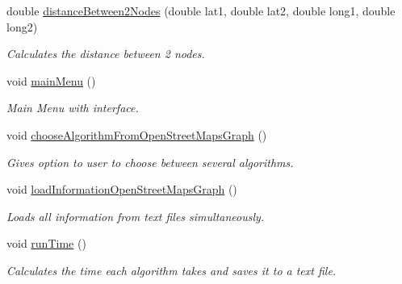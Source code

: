 \begin{DoxyCompactItemize}
\hypertarget{class_supermarket_network_afa07b2bec1aaac617a5072ad4178c704}{}\label{class_supermarket_network_afa07b2bec1aaac617a5072ad4178c704} 
double \hyperlink{class_supermarket_network_afa07b2bec1aaac617a5072ad4178c704}{distance\+Between2\+Nodes} (double lat1, double lat2, double long1, double long2)
\begin{DoxyCompactList}\small\item\em Calculates the distance between 2 nodes. \end{DoxyCompactList}\item 
\hypertarget{class_supermarket_network_a7391fed455ac1959445987a301ed8002}{}\label{class_supermarket_network_a7391fed455ac1959445987a301ed8002} 
void \hyperlink{class_supermarket_network_a7391fed455ac1959445987a301ed8002}{main\+Menu} ()
\begin{DoxyCompactList}\small\item\em Main Menu with interface. \end{DoxyCompactList}\item 
\hypertarget{class_supermarket_network_a8f26a5537e646d71c58b6910975a99cf}{}\label{class_supermarket_network_a8f26a5537e646d71c58b6910975a99cf} 
void \hyperlink{class_supermarket_network_a8f26a5537e646d71c58b6910975a99cf}{choose\+Algorithm\+From\+Open\+Street\+Maps\+Graph} ()
\begin{DoxyCompactList}\small\item\em Gives option to user to choose between several algorithms. \end{DoxyCompactList}\item 
\hypertarget{class_supermarket_network_a2a8df3eab5b698385a7dfad9b0d57d5a}{}\label{class_supermarket_network_a2a8df3eab5b698385a7dfad9b0d57d5a} 
void \hyperlink{class_supermarket_network_a2a8df3eab5b698385a7dfad9b0d57d5a}{load\+Information\+Open\+Street\+Maps\+Graph} ()
\begin{DoxyCompactList}\small\item\em Loads all information from text files simultaneously. \end{DoxyCompactList}\item 
\hypertarget{class_supermarket_network_a7e244200330ef7f5542beff1a353c877}{}\label{class_supermarket_network_a7e244200330ef7f5542beff1a353c877} 
void \hyperlink{class_supermarket_network_a7e244200330ef7f5542beff1a353c877}{run\+Time} ()
\begin{DoxyCompactList}\small\item\em Calculates the time each algorithm takes and saves it to a text file. \end{DoxyCompactList}\end{DoxyCompactItemize}


